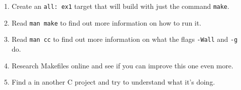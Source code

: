 \begin{enumerate}
\item Create an \verb|all: ex1| target that will build  with
    just the command \verb|make|.
\item Read \verb|man make| to find out more information on how to run it.
\item Read \verb|man cc| to find out more information on what the flags \verb|-Wall| and \verb|-g| do.
\item Research Makefiles online and see if you can improve this one even more.
\item Find a  in another C project and try to understand
    what it's doing.
\end{enumerate}

